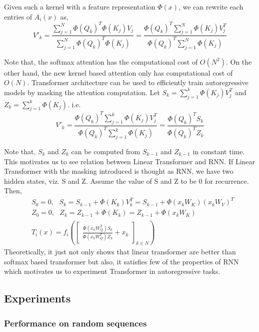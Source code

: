 \documentclass{article}
\begin{document}
Given such a kernel with a feature representation $\Phi(x)$, we can rewrite 
each entries of $A_i(x)$ as,
\begin{equation}
    V'_k=\frac{\sum_{j=1}^{N}\Phi(Q_k)^T\Phi(K_j)V_j}{\sum_{j=1}^{N}\Phi(Q_k)^T\Phi(K_j)}=\frac{\Phi(Q_k)^T\sum_{j=1}^{N}\Phi(K_j)V_j^T}{\Phi(Q_k)^T\sum_{j=1}^{N}\Phi(K_j)}  
\end{equation}

Note that, the softmax attention has the computational cost of $O(N^2)$. On the other hand, the new kernel based attention only has computational cost of $O(N)$.
Transformer architecture can be used to efficiently train autoregressive models by masking the attention computation. Let $S_k=\sum_{j=1}^{k}\Phi(K_j)V_j^T$ and $Z_k=\sum_{j=1}^{k}\Phi(K_j)$. i.e. 
\begin{equation}
    V'_k=\frac{\Phi(Q_k)^T\sum_{j=1}^{k}\Phi(K_j)V_j^T}{\Phi(Q_k)^T\sum_{j=1}^{k}\Phi(K_j)}=\frac{\Phi(Q_k)^TS_k}{\Phi(Q_k)^TZ_k}
\end{equation}

Note that, $S_k$ and $Z_k$ can be computed from $S_{k-1}$ and $Z_{k-1}$ in constant time. This motivates us to see relation between Linear Transformer and RNN. If Linear Transformer with the masking introduced is thought as RNN, we have two hidden states, viz. S and Z. Assume the value of S and Z to be 0 for recurrence. Then,
\begin{align*}
    &S_0=0,\text{ } S_k=S_{k-1}+\Phi(K_k)V_k^T=S_{k-1}+\Phi(x_kW_K)(x_kW_V)^T\\
    &Z_0=0,\text{ } Z_k=Z_{k-1}+\Phi(K_k)=Z_{k-1}+\Phi(x_kW_K)\\
    &T_i(x)=f_i \left(\begin{bmatrix}
        \frac{\Phi(x_kW_Q^T)S_k}{\Phi(x_kW_Q^T)Z_k}+x_k
    \end{bmatrix}_{k \in N}\right)
\end{align*}
Theoretically, it just not only shows that linear transformer are better than softmax based transformer but also, it satisfies few of the properties of RNN which motivates us to experiment Transformer in autoregressive tasks.
\subsection{Experiments}
\subsubsection{Performance on random sequences}
\end{document}
